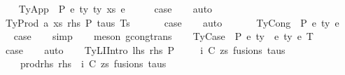 \begin{isabellebody}
\isamarkupfalse%
\isanewline
\ \ \isamarkupfalse%
\ {\isacharparenleft}{\kern0pt}TyApp\ {\isasymGamma}\ P\ e{}\ ty{}\ ty{}\ xs\ e{}{\isacharparenright}{\kern0pt}\isanewline
\ \ \isamarkupfalse%
\ \isamarkupfalse%
\ {\isacharquery}{\kern0pt}case\isanewline
\ \ \isamarkupfalse%
\ auto\isanewline
\ \ \isamarkupfalse%
\isanewline
{}\isamarkupfalse%
\isanewline
\ \ \isamarkupfalse%
\ {\isacharparenleft}{\kern0pt}TyProd\ a\ xs\ rhs\ P\ taus\ Ts\ {\isasymGamma}{\isacharparenright}{\kern0pt}\isanewline
\ \ \isamarkupfalse%
\ \isamarkupfalse%
\ {\isacharquery}{\kern0pt}case\isanewline
\ \ \isamarkupfalse%
\ auto\isanewline
\ \ \isamarkupfalse%
\isanewline
{}\isamarkupfalse%
\isanewline
\ \ \isamarkupfalse%
\ {\isacharparenleft}{\kern0pt}TyCong\ {\isasymGamma}\ P\ e{}\ ty\ e{}{\isacharparenright}{\kern0pt}\isanewline
\ \ \isamarkupfalse%
\ \isamarkupfalse%
\ {\isacharquery}{\kern0pt}case\isanewline
\ \ \isamarkupfalse%
\ simp\isanewline
\ \ \isamarkupfalse%
\ {\isacharparenleft}{\kern0pt}meson\ gcong{\isachardot}{\kern0pt}trans{\isacharparenright}{\kern0pt}\isanewline
{}\isamarkupfalse%
\isanewline
\ \ \isamarkupfalse%
\ {\isacharparenleft}{\kern0pt}TyCase\ {\isasymGamma}\ P\ e{}\ ty{}\ {\isasymGamma}{}\ e{}\ ty{}\ e{}\ T{\isacharparenright}{\kern0pt}\isanewline
\ \ \isamarkupfalse%
\ \isamarkupfalse%
\ {\isacharquery}{\kern0pt}case\isanewline
\ \ \isamarkupfalse%
\ auto\isanewline
{}\isamarkupfalse%
\isanewline
\ \ \isamarkupfalse%
\ {\isacharparenleft}{\kern0pt}TyLIIntro\ lhs\ rhs\ P\ {\isasymGamma}{\isacharparenright}{\kern0pt}\isanewline
\ \ \isamarkupfalse%
\ i\ C\ zs\ fusions\ taus\ \isanewline
\ \ \ \ prod{\isacharunderscore}{\kern0pt}rhs{\isacharcolon}{\kern0pt}\ {\isachardoublequoteopen}rhs\ {\isacharequal}{\kern0pt}\ {\isacharparenleft}{\kern0pt}i{\isacharcomma}{\kern0pt}\ {\isacharparenleft}{\kern0pt}C{\isacharcomma}{\kern0pt}\ zs{\isacharparenright}{\kern0pt}{\isacharcomma}{\kern0pt}\ fusions{\isacharcomma}{\kern0pt}\ taus{\isacharparenright}{\kern0pt}{\isachardoublequoteclose}\isanewline

\end{isabellebody}
